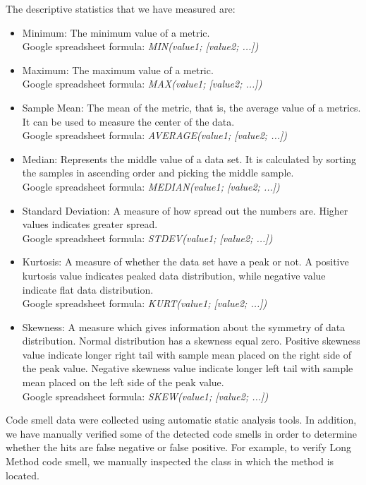 The descriptive statistics that we have measured are:
\begin{itemize}
	\item Minimum: The minimum value of a metric. \\ Google spreadsheet formula: \textit{MIN(value1; [value2; ...])}
	\item Maximum: The maximum value of a metric. \\ Google spreadsheet formula: \textit{MAX(value1; [value2; ...])}
	\item Sample Mean: The mean of the metric, that is, the average value of a metrics. It can be used to measure the center of the data. \\ Google spreadsheet formula: \textit{AVERAGE(value1; [value2; ...])}
	\item Median: Represents the middle value of a data set. It is calculated by sorting the samples in ascending order and picking the middle sample\cite{Wohlin:2000:ESE:330775}. \\ Google spreadsheet formula: \textit{MEDIAN(value1; [value2; ...])}
	\item Standard Deviation: A measure of how spread out the numbers are. Higher values indicates greater spread. \\ Google spreadsheet formula: \textit{STDEV(value1; [value2; ...])}
	\item Kurtosis: A measure of whether the data set have a peak or not. A positive kurtosis value indicates peaked data distribution, while negative value indicate flat data distribution. \\ Google spreadsheet formula: \textit{KURT(value1; [value2; ...])}
	\item Skewness: A measure which gives information about the symmetry of data distribution. Normal distribution has a skewness equal zero. Positive skewness value indicate longer right tail with sample mean placed on the right side of the peak value. Negative skewness value indicate longer left tail with sample mean placed on the left side of the peak value. \\ Google spreadsheet formula: \textit{SKEW(value1; [value2; ...])}
\end{itemize}

Code smell data were collected using automatic static analysis tools. In addition, we have manually verified some of the detected code smells in order to determine whether the hits are false negative or false positive. For example, to verify Long Method code smell, we manually inspected the class in which the method is located. 

